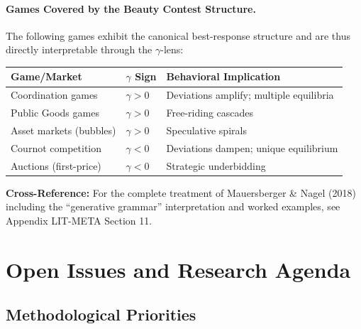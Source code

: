 \paragraph{Games Covered by the Beauty Contest Structure.}
The following games exhibit the canonical best-response structure and are thus
directly interpretable through the $\gamma$-lens:

\begin{center}
\renewcommand{\arraystretch}{1.2}
\begin{tabular}{@{}p{4.5cm}p{3cm}p{5cm}@{}}
\toprule
\textbf{Game/Market} & \textbf{$\gamma$ Sign} & \textbf{Behavioral Implication} \\
\midrule
Coordination games & $\gamma > 0$ & Deviations amplify; multiple equilibria \\
Public Goods games & $\gamma > 0$ & Free-riding cascades \\
Asset markets (bubbles) & $\gamma > 0$ & Speculative spirals \\
Cournot competition & $\gamma < 0$ & Deviations dampen; unique equilibrium \\
Auctions (first-price) & $\gamma < 0$ & Strategic underbidding \\
\bottomrule
\end{tabular}
\end{center}

\textbf{Cross-Reference:} For the complete treatment of Mauersberger \& Nagel (2018)
including the ``generative grammar'' interpretation and worked examples, see
Appendix LIT-META Section 11.


\section{Open Issues and Research Agenda}
\label{sec:B-open-issues}

\subsection{Methodological Priorities}

